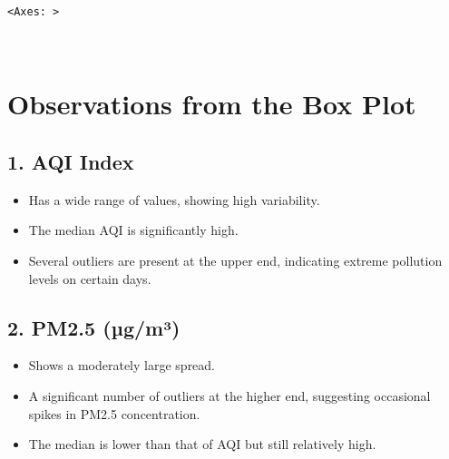 \documentclass[11pt]{article}
\makeatletter
\providecommand{\tightlist}{%
      \setlength{\itemsep}{0pt}\setlength{\parskip}{0pt}}
\newcommand{\boxspacing}{\kern\kvtcb@left@rule\kern\kvtcb@boxsep}
\newcommand{\prompt}[4]{
        {\ttfamily\llap{{\color{#2}[#3]:\hspace{3pt}#4}}\vspace{-\baselineskip}}
    }
\makeatother
\begin{document}
            \begin{tcolorbox}[breakable, size=fbox, boxrule=.5pt, pad at break*=1mm, opacityfill=0]
\prompt{Out}{outcolor}{40}{\boxspacing}
\begin{Verbatim}[commandchars=\\\{\}]
<Axes: >
\end{Verbatim}
\end{tcolorbox}
        
    \begin{center}
    \end{center}
    { \hspace*{\fill} \\}
    
    \hypertarget{observations-from-the-box-plot}{%
\section{\texorpdfstring{\textbf{Observations from the Box
Plot}}{Observations from the Box Plot}}\label{observations-from-the-box-plot}}

\hypertarget{aqi-index}{%
\subsection{\texorpdfstring{\textbf{1. AQI
Index}}{1. AQI Index}}\label{aqi-index}}

\begin{itemize}
\tightlist
\item
  Has a wide range of values, showing high variability.
\item
  The median AQI is significantly high.
\item
  Several outliers are present at the upper end, indicating extreme
  pollution levels on certain days.
\end{itemize}

\hypertarget{pm2.5-uxb5gmuxb3}{%
\subsection{\texorpdfstring{\textbf{2. PM2.5
(µg/m³)}}{2. PM2.5 (µg/m³)}}\label{pm2.5-uxb5gmuxb3}}

\begin{itemize}
\tightlist
\item
  Shows a moderately large spread.
\item
  A significant number of outliers at the higher end, suggesting
  occasional spikes in PM2.5 concentration.
\item
  The median is lower than that of AQI but still relatively high.
\end{itemize}
\end{document}
